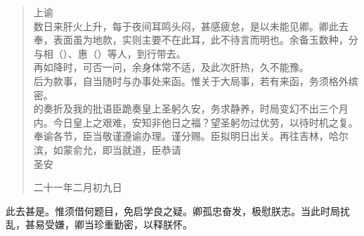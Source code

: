 \begin{quote}
	上谕\\

数日来肝火上升，每于夜间耳鸣头闷，甚感疲怠，是以未能见卿。卿此去奉，表面虽为地款，实则主要不在此耳，此不待言而明也。余备玉数种，分与相（）、惠（）等人，到行带去。\\

再如降时，可否一问，余身体常不适，及此次肝热，久不能豫。\\

后为款事，自当随时与办事处来函。惟关于大局事，若有来函，务须格外缤密。\\

的奏折及我的批语臣跪奏皇上圣躬久安，务求静养，时局变幻不出三个月内。今日皇上之艰难，安知非他日之福？望圣躬勿过优劳，以待时机之复。奉谕各节，臣当敬谨遵谕办理。谨分赐。臣拟明日出关。再往吉林，哈尔滨，如蒙俞允，即当就道，臣恭请\\

圣安\\

\begin{flushright}
	二十一年二月初九日\\
\end{flushright}
\end{quote}

此去甚是。惟须借何题目，免启学良之疑。卿孤忠奋发，极慰朕志。当此时局扰乱，甚易受嫌，卿当珍重勤密，以释朕怀。
